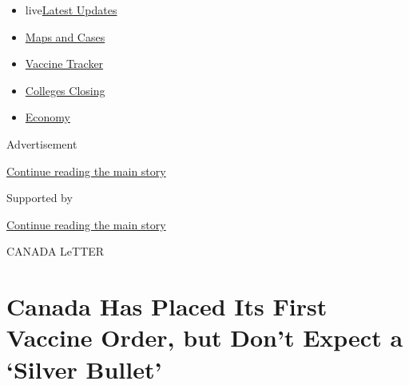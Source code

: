 \begin{itemize}
\tightlist
\item
  live\href{https://www.nytimes3xbfgragh.onion/2020/08/21/world/covid-19-coronavirus.html?name=styln-coronavirus-national\&region=TOP_BANNER\&variant=undefined\&block=storyline_menu_recirc\&action=click\&pgtype=Article\&impression_id=24d07b21-e390-11ea-bc3e-7712c2f37c01}{Latest
  Updates}
\item
  \href{https://www.nytimes3xbfgragh.onion/interactive/2020/us/coronavirus-us-cases.html?name=styln-coronavirus-national\&region=TOP_BANNER\&variant=undefined\&block=storyline_menu_recirc\&action=click\&pgtype=Article\&impression_id=24d07b22-e390-11ea-bc3e-7712c2f37c01}{Maps
  and Cases}
\item
  \href{https://www.nytimes3xbfgragh.onion/interactive/2020/science/coronavirus-vaccine-tracker.html?name=styln-coronavirus-national\&region=TOP_BANNER\&variant=undefined\&block=storyline_menu_recirc\&action=click\&pgtype=Article\&impression_id=24d07b23-e390-11ea-bc3e-7712c2f37c01}{Vaccine
  Tracker}
\item
  \href{https://www.nytimes3xbfgragh.onion/2020/08/19/us/colleges-closing-covid.html?name=styln-coronavirus-national\&region=TOP_BANNER\&variant=undefined\&block=storyline_menu_recirc\&action=click\&pgtype=Article\&impression_id=24d0a230-e390-11ea-bc3e-7712c2f37c01}{Colleges
  Closing}
\item
  \href{https://www.nytimes3xbfgragh.onion/live/2020/08/20/business/stock-market-today-coronavirus?name=styln-coronavirus-national\&region=TOP_BANNER\&variant=undefined\&block=storyline_menu_recirc\&action=click\&pgtype=Article\&impression_id=24d0a231-e390-11ea-bc3e-7712c2f37c01}{Economy}
\end{itemize}

Advertisement

\protect\hyperlink{after-top}{Continue reading the main story}

Supported by

\protect\hyperlink{after-sponsor}{Continue reading the main story}

CANADA LeTTER

\hypertarget{canada-has-placed-its-first-vaccine-order-but-dont-expect-a-silver-bullet}{%
\section{Canada Has Placed Its First Vaccine Order, but Don't Expect a
`Silver
Bullet'}\label{canada-has-placed-its-first-vaccine-order-but-dont-expect-a-silver-bullet}}

